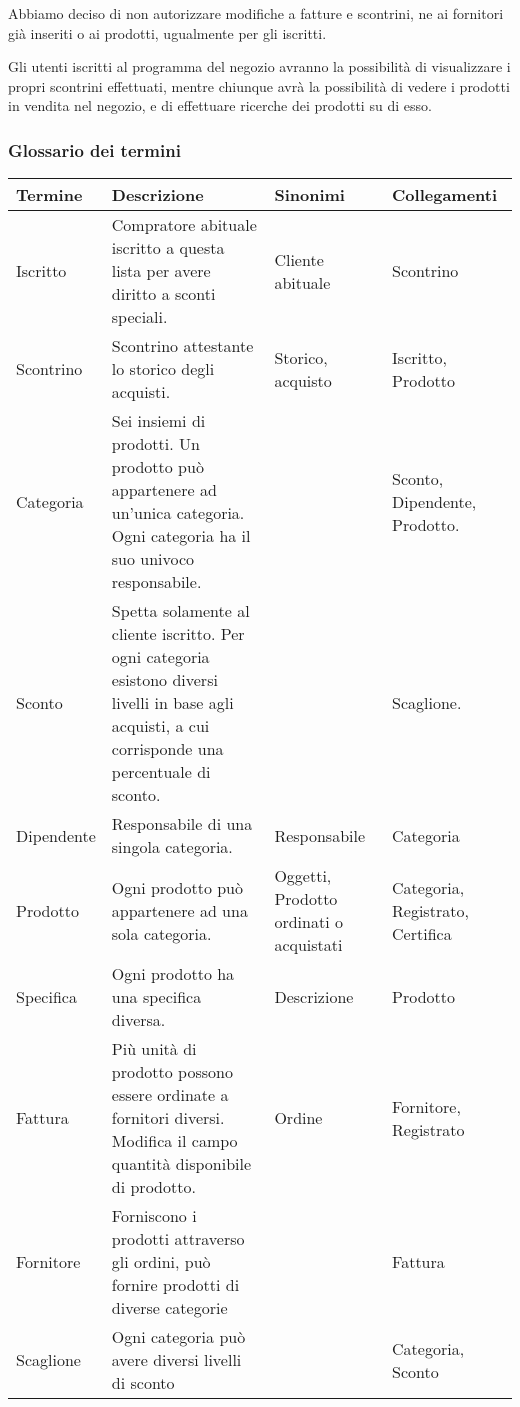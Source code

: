 Abbiamo deciso di non autorizzare modifiche a fatture e scontrini, ne ai fornitori gi\`a inseriti o ai prodotti, ugualmente per gli iscritti.

Gli utenti iscritti al programma del negozio avranno la possibilit\`a di visualizzare i propri scontrini effettuati, mentre chiunque avr\`a la possibilit\`a di vedere i prodotti in vendita nel negozio, e di effettuare ricerche dei prodotti su di esso.

\subsubsection{Glossario dei termini}
\begin{center}
\begin{tabular}{ l | p{5cm} | p{3cm} | p{3cm} }

\textbf{Termine} & \textbf{Descrizione} & \textbf{Sinonimi} & \textbf{Collegamenti} \\ \hline

Iscritto & Compratore abituale iscritto a questa lista per avere diritto a sconti speciali. & Cliente abituale & Scontrino \\ \hline

Scontrino & Scontrino attestante lo storico degli acquisti. & Storico, acquisto & Iscritto, Prodotto \\ \hline

Categoria & Sei insiemi di prodotti. Un prodotto pu\`o appartenere ad un'unica categoria. Ogni categoria ha il suo univoco responsabile. & & Sconto, Dipendente, Prodotto. \\ \hline

Sconto & Spetta solamente al cliente iscritto. Per ogni categoria esistono diversi livelli in base agli acquisti, a cui corrisponde una percentuale di sconto. & & Scaglione. \\ \hline

Dipendente & Responsabile di una singola categoria. & Responsabile & Categoria \\ \hline

Prodotto & Ogni prodotto pu\`o appartenere ad una sola categoria. & Oggetti, Prodotto ordinati o acquistati & Categoria, Registrato, Certifica \\ \hline

Specifica & Ogni prodotto ha una specifica diversa. & Descrizione & Prodotto \\ \hline

Fattura & Pi\`u unit\`a di prodotto possono essere ordinate a fornitori diversi. Modifica il campo quantit\`a disponibile di prodotto. & Ordine & Fornitore, Registrato \\ \hline

Fornitore & Forniscono i prodotti attraverso gli ordini, pu\`o fornire prodotti di diverse categorie & & Fattura \\ \hline

Scaglione & Ogni categoria pu\`o avere diversi livelli di sconto & & Categoria, Sconto \\


\end{tabular}
\end{center}
